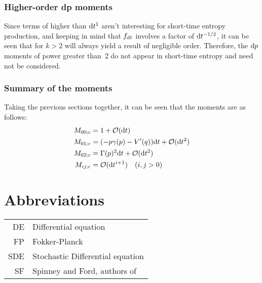 \subsubsection{Higher-order dp moments}

Since terms of higher than \(\mathrm{d} t^1\) aren't interesting for short-time entropy production, and keeping in mind that \(f_{\mathrm{d} t}\) involves a factor of \(\mathrm{d} t^{-1/2}\), it can be seen that for \(k>2\)  will always yield a result of negligible order. Therefore, the \(\mathrm{d} p\) moments of power greater than~\(2\) do not appear in short-time entropy and need not be considered.

\subsubsection{Summary of the moments}

Taking the previous sections together, it can be seen that the moments are as follows:
%
\begin{align}
	M_{00;c} &= 1 + \mathcal{O}(\mathrm{d} t) \\
	M_{01;c} &= (-p\gamma(p) - V'(q)) \mathrm{d} t + \mathcal{O}(\mathrm{d} t^2) \\
	M_{02;c} &= \Gamma(p)^2 \mathrm{d} t + \mathcal{O}(\mathrm{d} t^2) \\
	M_{ij;c} &= \mathcal{O}(\mathrm{d} t^{i+1}) \quad (i,j > 0)
\end{align}


\section{Abbreviations}


\begin{tabular}{r l}
	DE & Differential equation \\
	FP & Fokker-Planck \\
	SDE & Stochastic Differential equation \\
	SF & Spinney and Ford, authors of \cite{sf}
\end{tabular}


